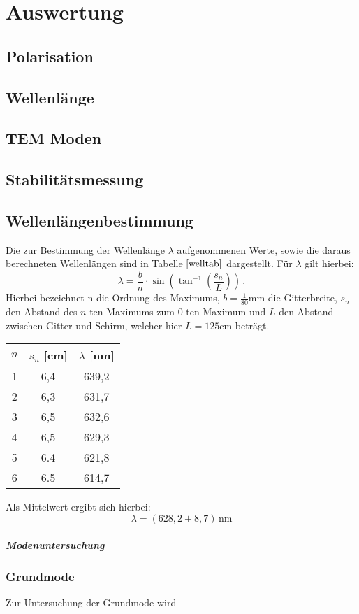 \section{Auswertung}
\subsection{Polarisation}
\subsection{Wellenlänge}
\subsection{TEM Moden}
\subsection{Stabilitätsmessung}
\subsection{Wellenlängenbestimmung}
Die zur Bestimmung der Wellenlänge $\lambda$ aufgenommenen Werte, sowie die daraus berechneten Wellenlängen sind in Tabelle $\ref{welltab}$ dargestellt. Für $\lambda$ gilt hierbei:
\begin{equation}
  \lambda = \frac{b}{n}\cdot\sin\left(\tan^{-1}\left(\frac{s_n}{L}\right)\right) \, .
\end{equation}
Hierbei bezeichnet n die Ordnung des Maximums, $b=\frac{1}{80}\si{\milli\meter}$ die Gitterbreite, $s_n$ den Abstand des $n$-ten Maximums zum $0$-ten Maximum und $L$ den Abstand zwischen Gitter und Schirm,
welcher hier $L=125 \si{\centi\meter}$ beträgt.
\begin{table}[H]
  \centering
\begin{tabular}{c|c|c}
$n$  & $s_n$ [cm]    & $\lambda$ [nm]     \\
\hline
1 & 6,4 & 639,2 \\
2 & 6,3 & 631,7 \\
3 & 6,5 & 632,6 \\
4 & 6,5 & 629,3 \\
5 & 6.4 & 621,8 \\
6 & 6.5 & 614,7
\end{tabular}
\end{table}
Als Mittelwert ergibt sich hierbei:
\begin{equation}
  \lambda= (628,2 \pm 8,7) \, \si{\nano\meter}
\end{equation}
\subparagraph{Modenuntersuchung}
\subsubsection{Grundmode}
Zur Untersuchung der Grundmode wird 
